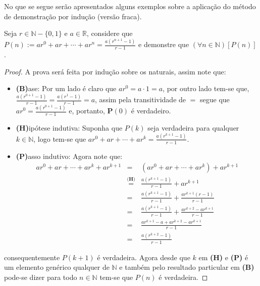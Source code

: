 No que se segue serão apresentados alguns exemplos sobre a aplicação do método de demonstração por indução (versão fraca). 

\begin{exemplo}\label{exe:InducaoFraca1}
	Seja $r \in \mathbb{N} - \{0, 1\}$ e $a \in \mathbb{R}$, considere que $P(n) := ar^0 + ar + \cdots + ar^n = \frac{a(r^{n + 1} - 1)}{r - 1}$ e demonstre que $(\forall n \in \mathbb{N})[P(n)]$.
	
	\begin{proof}
		A prova será feita por indução sobre os naturais, assim note que:
		\begin{itemize}
			\item[ ] \textbf{(B)}ase: Por um lado é claro que $ar^0 = a \cdot 1 = a$, por outro lado tem-se que, $\frac{a(r^{0 + 1} - 1)}{r - 1}  = \frac{a(r^{1} - 1)}{r - 1} = a$, assim pela transitividade de $=$ segue que $ar^0 = \frac{a(r^{0 + 1} - 1)}{r - 1} $ e, portanto, $\textbf{P}(0)$ é verdadeiro.
			\item[ ] \textbf{(H)}ipótese indutiva: Suponha que $P(k)$ seja verdadeira para qualquer $k \in \mathbb{N}$, logo tem-se que $ar^0 + ar + \cdots + ar^k = \frac{a(r^{k + 1} - 1)}{r - 1}$.
			\item[ ] \textbf{(P)}asso indutivo: Agora note que:
			\begin{eqnarray*}
				ar^0 + ar + \cdots + ar^k +  ar^{k +1 } & = & (ar^0 + ar + \cdots + ar^k) +  ar^{k +1 }\\
				& \stackrel{\textbf{(H)}}{=} & \frac{a(r^{k + 1} - 1)}{r - 1} + ar^{k +1 }\\
				& = &  \frac{a(r^{k + 1} - 1)}{r - 1} + \frac{ar^{k +1 } (r-1)}{r- 1}\\
				& = &  \frac{a(r^{k + 1} - 1)}{r - 1} + \frac{ar^{k +2} - ar^{k + 1}}{r- 1}\\
				& = & \frac{ar^{k + 1} - a + ar^{k +2} - ar^{k + 1}}{r-1}\\
				& = & \frac{a(r^{k+2} -1)}{r-1}
			\end{eqnarray*}
		\end{itemize}
		consequentemente $P(k + 1)$ é verdadeira. Agora desde que $k$ em \textbf{(H)} e \textbf{(P)} é um elemento genérico qualquer de $\mathbb{N}$ e também pelo resultado particular em  \textbf{(B)} pode-se dizer para todo $n \in \mathbb{N}$ tem-se que $P(n)$ é verdadeira.
	\end{proof}
\end{exemplo}

